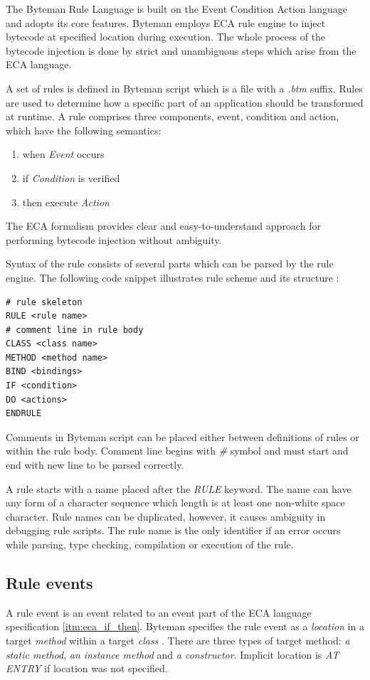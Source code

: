 \documentclass[12pt,oneside]{fithesis2}
\begin{document}
The Byteman Rule Language is built on the Event Condition Action language and adopts its core features. Byteman employs ECA rule engine to inject bytecode at specified location during execution. The whole process of the bytecode injection is done by strict and unambiguous steps which arise from the ECA language.

A set of rules is defined in Byteman script which is a file with a \textit{.btm} suffix. Rules are used to determine how a specific part of an application should be transformed at runtime. A rule comprises three components, event, condition and action, which have the following semantics\cite{eca}:

\begin{enumerate}
\label{itm:eca_if_then}
   \item when \textit{Event} occurs
   \item if \textit{Condition} is verified
   \item then execute \textit{Action}
\end{enumerate}

The ECA formalism provides clear and easy-to-understand approach for performing bytecode injection without ambiguity.

Syntax of the rule consists of several parts which can be parsed by the rule engine. The following code snippet illustrates rule scheme and its structure \cite[Rule Events]{byteman_doc}:

\begin{lstlisting}[caption = Byteman rule scheme, label = byteman_scheme]
# rule skeleton
RULE <rule name>
# comment line in rule body
CLASS <class name>
METHOD <method name>
BIND <bindings>
IF <condition>
DO <actions>
ENDRULE
\end{lstlisting}

Comments in Byteman script can be placed either between definitions of rules or within the rule body. Comment line begins with \textit{\#} symbol and must start and end with new line to be parsed correctly.

A rule starts with a name placed after the \textit{RULE} keyword. The name can have any form of a character sequence which length is at least one non-white space character. Rule names can be duplicated, however, it causes ambiguity in debugging rule scripts. The rule name is the only identifier if an error occurs while parsing, type checking, compilation or execution of the rule.

\subsection{Rule events}
\label{subsec:rule_events}
A rule event is an event related to an event part of the ECA language specification \ref{itm:eca_if_then}. Byteman specifies the rule event as a \textit{location} in a target \textit{method} within a target \textit{class} \cite[Rule Events]{byteman_doc}. There are three types of target method: \textit{a static method}, \textit{an instance method} and \textit{a constructor}. Implicit location is \textit{AT ENTRY} if location was not specified.
\end{document}
